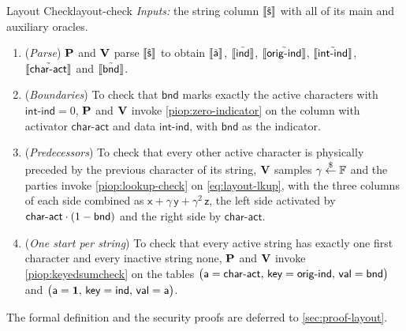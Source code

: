 \begin{DefinePIOP}{Layout Check}{layout-check}
  \emph{Inputs:} the string column $\llbracket\hat{\mathsf{s}}\rrbracket$ with all of its main and auxiliary oracles.
  \begin{enumerate}[nosep]
    \item (\emph{Parse}) $\bf{P}$ and $\bf{V}$ parse $\llbracket\hat{\mathsf{s}}\rrbracket$ to obtain $\llbracket\tilde{\mathsf{a}}\rrbracket$, $\llbracket\tilde{\mathsf{ind}}\rrbracket$, $\llbracket\tilde{\mathsf{orig\text{-}ind}}\rrbracket$, $\llbracket\tilde{\mathsf{int\text{-}ind}}\rrbracket$, $\llbracket\tilde{\mathsf{char\text{-}act}}\rrbracket$ and $\llbracket\tilde{\mathsf{bnd}}\rrbracket$.
    \item (\emph{Boundaries}) To check that $\mathsf{bnd}$ marks exactly the active characters with $\mathsf{int\text{-}ind} = 0$, $\bf{P}$ and $\bf{V}$ invoke \cref{piop:zero-indicator} on the column with activator $\mathsf{char\text{-}act}$ and data $\mathsf{int\text{-}ind}$, with $\mathsf{bnd}$ as the indicator.
    \item (\emph{Predecessors}) To check that every other active character is physically preceded by the previous character of its string, $\bf{V}$ samples $\gamma \overset{\$}{\leftarrow} \mathbb{F}$ and the parties invoke \cref{piop:lookup-check} on \cref{eq:layout-lkup}, with the three columns of each side combined as $\mathsf{x} + \gamma\,\mathsf{y} + \gamma^2\,\mathsf{z}$, the left side activated by $\mathsf{char\text{-}act}\cdot(1-\mathsf{bnd})$ and the right side by $\mathsf{char\text{-}act}$.
    \item (\emph{One start per string}) To check that every active string has exactly one first character and every inactive string none, $\bf{P}$ and $\bf{V}$ invoke \cref{piop:keyedsumcheck} on the tables $\bigl(\mathsf{a} = \mathsf{char\text{-}act},\, \mathsf{key} = \mathsf{orig\text{-}ind},\, \mathsf{val} = \mathsf{bnd}\bigr)$ and $\bigl(\mathsf{a} = \mathbf{1},\, \mathsf{key} = \mathsf{ind},\, \mathsf{val} = \mathsf{a}\bigr)$.
  \end{enumerate}
\end{DefinePIOP}
The formal definition and the security proofs are deferred to \cref{sec:proof-layout}.

